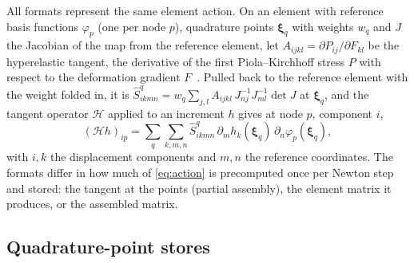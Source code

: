 \documentclass[sigconf,review]{acmart}
\newcommand{\xhat}{\boldsymbol{\xi}}
\newcommand{\Sq}{\widehat{S}^{q}}
\begin{document}
All formats represent the same element action.  On an element with reference basis functions
$\varphi_p$ (one per node $p$), quadrature points $\xhat_q$ with weights $w_q$ and $J$ the Jacobian of
the map from the reference element, let $A_{ijkl}=\partial P_{ij}/\partial F_{kl}$ be the hyperelastic
tangent, the derivative of the first Piola--Kirchhoff stress $P$ with respect to the deformation
gradient $F$~\cite{BonetWood2008}.  Pulled back to the reference element with the weight folded in,
it is $\Sq_{ikmn} = w_q\sum_{j,l} A_{ijkl}\,J^{-1}_{nj} J^{-1}_{ml}\det J$ at $\xhat_q$, and the tangent
operator $\mathcal{H}$ applied to an increment $h$ gives at node $p$, component $i$,
\begin{equation}
  (\mathcal{H} h)_{ip} = \sum_{q}\sum_{k,m,n} \Sq_{ikmn}\, \partial_m h_k(\xhat_q)\,
  \partial_n\varphi_p(\xhat_q) ,
  \label{eq:action}
\end{equation}
with $i,k$ the displacement components and $m,n$ the reference coordinates.
The formats differ in how much of \eqref{eq:action} is precomputed once per Newton step and stored:
the tangent at the points (partial assembly), the element matrix it produces, or the assembled
matrix.

\subsection{Quadrature-point stores}
\end{document}
